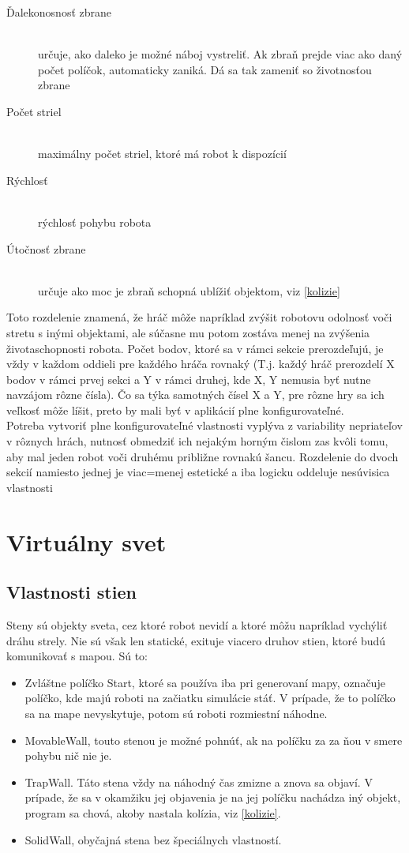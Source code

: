 \begin{description}
\begin{description}
\item [Ďalekonosnosť zbrane]\hfill \\ určuje, ako daleko je možné náboj vystreliť. Ak zbraň prejde viac ako daný počet políčok, automaticky zaniká. Dá sa tak zameniť so životnosťou zbrane
\item [Počet striel]\hfill \\ maximálny počet striel, ktoré má robot k dispozícií
\item [Rýchlosť]\hfill \\ rýchlosť pohybu robota
\item [Útočnosť zbrane]\hfill \\ určuje ako moc je zbraň schopná ublížiť objektom, viz \ref{kolizie}
\end{description}
\end{description}
Toto rozdelenie znamená, že hráč môže napríklad zvýšit robotovu odolnosť voči stretu s inými objektami, ale súčasne mu potom zostáva menej na zvýšenia životaschopnosti robota. Počet bodov, ktoré sa v rámci sekcie prerozdeľujú, je vždy v každom oddieli pre každého hráča rovnaký (T.j. každý hráč prerozdelí X bodov v rámci prvej sekci a  Y v rámci druhej, kde X, Y nemusia byť nutne navzájom rôzne čísla). Čo sa týka samotných čísel X a Y, pre rôzne hry sa ich veľkosť môže líšit, preto by mali byť v aplikácií plne konfigurovateľné.\\
Potreba vytvoriť plne konfigurovateľné vlastnosti vyplýva z variability nepriateľov v rôznych hrách, nutnosť obmedziť ich nejakým horným čislom zas kvôli tomu, aby mal jeden robot voči druhému približne rovnakú šancu. Rozdelenie do dvoch sekcií namiesto jednej je viac=menej estetické a iba logicku oddeluje nesúvisica vlastnosti
\section { Virtuálny svet }
\subsection{Vlastnosti stien}\label{walls} %
Steny sú objekty sveta, cez ktoré robot nevidí a ktoré môžu napríklad vychýliť dráhu strely. Nie sú však len statické, exituje viacero druhov stien, ktoré budú komunikovať s mapou. Sú to:\\
\begin{itemize}
\item Zvláštne políčko Start, ktoré sa používa iba pri generovaní mapy, označuje políčko, kde majú roboti na začiatku simulácie stáť. V prípade, že to políčko sa na mape nevyskytuje, potom sú roboti rozmiestní náhodne.
\item MovableWall, touto stenou je možné pohnúť, ak na políčku za za ňou v smere pohybu nič nie je.
\item TrapWall. Táto stena vždy na náhodný čas zmizne a znova sa objaví. V prípade, že sa v okamžiku jej objavenia je na jej políčku nachádza iný objekt, program sa chová, akoby nastala kolízia, viz \ref{kolizie}.
\item SolidWall, obyčajná stena bez špeciálnych vlastností.
\end {itemize}
